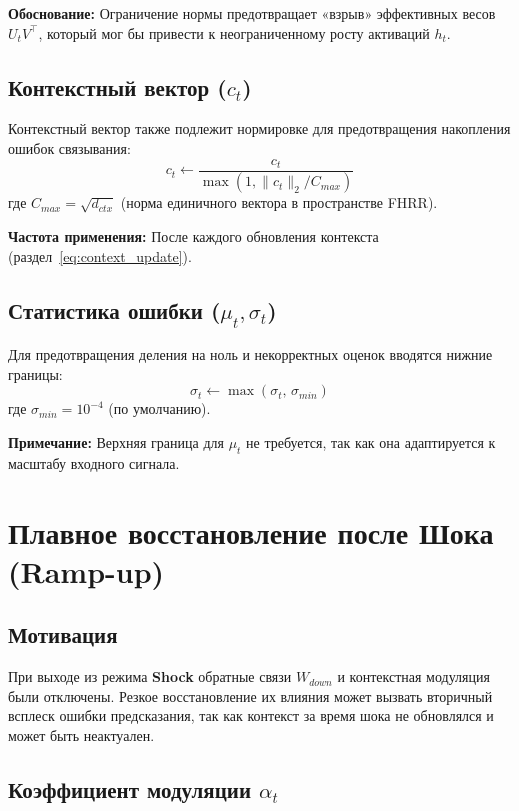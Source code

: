 \textbf{Обоснование:} Ограничение нормы предотвращает «взрыв» эффективных весов $U_t V^\top$, который мог бы привести к неограниченному росту активаций $h_t$.

\subsection{Контекстный вектор ($c_t$)}

Контекстный вектор также подлежит нормировке для предотвращения накопления ошибок связывания:
\begin{equation}
c_t \leftarrow \frac{c_t}{\max(1, \|c_t\|_2 / C_{max})}
\label{eq:context_clipping}
\end{equation}
где $C_{max} = \sqrt{d_{ctx}}$ (норма единичного вектора в пространстве FHRR).

\textbf{Частота применения:} После каждого обновления контекста (раздел~\ref{eq:context_update}).

\subsection{Статистика ошибки ($\mu_t, \sigma_t$)}

Для предотвращения деления на ноль и некорректных оценок вводятся нижние границы:
\begin{equation}
\sigma_t \leftarrow \max(\sigma_t, \, \sigma_{min})
\label{eq:sigma_floor}
\end{equation}
где $\sigma_{min} = 10^{-4}$ (по умолчанию).

\textbf{Примечание:} Верхняя граница для $\mu_t$ не требуется, так как она адаптируется к масштабу входного сигнала.

\section{Плавное восстановление после Шока (Ramp-up)}

\subsection{Мотивация}

При выходе из режима \textbf{Shock} обратные связи $W_{down}$ и контекстная модуляция были отключены. Резкое восстановление их влияния может вызвать вторичный всплеск ошибки предсказания, так как контекст за время шока не обновлялся и может быть неактуален.

\subsection{Коэффициент модуляции $\alpha_t$}

